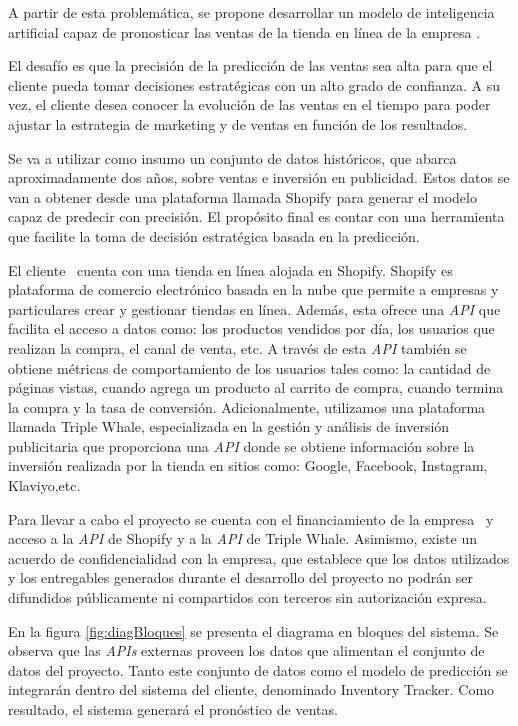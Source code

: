 \documentclass[
11pt, %
]{charter}
\begin{document}
A partir de esta problemática, se propone desarrollar un modelo de inteligencia artificial capaz de pronosticar las ventas de la tienda en línea de la empresa \empclientename. 

El desafío es que la precisión de la predicción de las ventas sea alta para que el cliente pueda tomar decisiones estratégicas con un alto grado de confianza. 
A su vez, el cliente desea conocer la evolución de las ventas en el tiempo para poder ajustar la estrategia de marketing y de ventas en función de los resultados.

Se va a utilizar como insumo un conjunto de datos históricos, que abarca aproximadamente dos años, sobre ventas e inversión en publicidad. 
Estos datos se van a obtener desde una plataforma llamada Shopify para generar el modelo capaz de predecir con precisión. 
El propósito final es contar con una herramienta que facilite la toma de decisión estratégica basada en la predicción.

El cliente \empclientename\ cuenta con una tienda en línea alojada en Shopify. 
Shopify es plataforma de comercio electrónico basada en la nube que permite a empresas y particulares crear y gestionar tiendas en línea. 
Además, esta ofrece una \textit{API} que facilita el acceso a datos como: los productos vendidos por día, los usuarios que realizan la compra, el canal de venta, etc. 
A través de esta \textit{API} también se obtiene métricas de comportamiento de los usuarios tales como: la cantidad de páginas vistas, cuando agrega un producto al carrito de compra, cuando termina la compra y la tasa de conversión.
Adicionalmente, utilizamos una plataforma llamada Triple Whale, especializada en la gestión y análisis de inversión publicitaria que proporciona una \textit{API} donde se obtiene información sobre la inversión realizada por la tienda en sitios como: Google, Facebook, Instagram, Klaviyo,etc.

Para llevar a cabo el proyecto se cuenta con el financiamiento de la empresa \empclientename\ y acceso a la \textit{API} de Shopify y a la \textit{API} de Triple Whale. 
Asimismo, existe un acuerdo de confidencialidad con la empresa, que establece que los datos utilizados y los entregables generados durante el desarrollo del proyecto no podrán ser difundidos públicamente ni compartidos con terceros sin autorización expresa.

En la figura \ref{fig:diagBloques} se presenta el diagrama en bloques del sistema. Se observa que las \textit{APIs} externas proveen los datos que alimentan el conjunto de datos del proyecto. Tanto este conjunto de datos como el modelo de predicción se integrarán dentro del sistema del cliente, denominado Inventory Tracker. Como resultado, el sistema generará el pronóstico de ventas.
\end{document}
